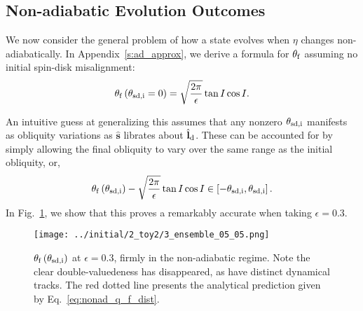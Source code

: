 \documentclass[
        fleqn,
        usenatbib,
        referee,
    ]{mnras}
\newcommand*{\bm}[1]{\boldsymbol{\mathbf{#1}}}
\newcommand*{\uv}[1]{\hat{\bm{#1}}}
\newcommand*{\p}[1]{\left(#1\right)}
\newcommand*{\s}[1]{\left[#1\right]}
\begin{document}
\subsection{Non-adiabatic Evolution Outcomes}

We now consider the general problem of how a state evolves when $\eta$ changes
non-adiabatically. In Appendix~\ref{s:ad_approx}, we derive a formula for
$\theta_{\rm f}$ assuming no initial spin-disk misalignment:
\begin{equation}
    \theta_{\rm f}\p{\theta_{\rm sd, i} = 0} = \sqrt{\frac{2\pi}{\epsilon}} \tan
        I\cos I.\label{eq:nonad_q_f}
\end{equation}

An intuitive guess at generalizing this assumes that any nonzero $\theta_{\rm
sd, i}$ manifests as obliquity variations as $\uv{s}$ librates about
$\uv{l}_{\rm d}$. These can be accounted for by simply allowing the final
obliquity to vary over the same range as the initial obliquity, or,
\begin{equation}
    \theta_{\rm f}\p{\theta_{\rm sd, i}} - \sqrt{\frac{2\pi}{\epsilon}} \tan
        I\cos I\in \s{-\theta_{\rm sd, i}, \theta_{\rm sd,i}}
        .\label{eq:nonad_q_f_dist}
\end{equation}
In Fig.~\ref{fig:nonad_3_ensemeble}, we show that this proves a remarkably
accurate when taking $\epsilon = 0.3$.
\begin{figure}
    \centering
    \texttt{[image: ../initial/2\_toy2/3\_ensemble\_05\_05.png]}
    \caption{$\theta_{\rm  f}\p{\theta_{\rm sd, i}}$ at $\epsilon = 0.3$, firmly
    in the non-adiabatic regime. Note the clear double-valuedeness has
    disappeared, as have distinct dynamical tracks. The red dotted line presents
    the analytical prediction given by
    Eq.~\eqref{eq:nonad_q_f_dist}.}\label{fig:nonad_3_ensemeble}
\end{figure}
\end{document}
